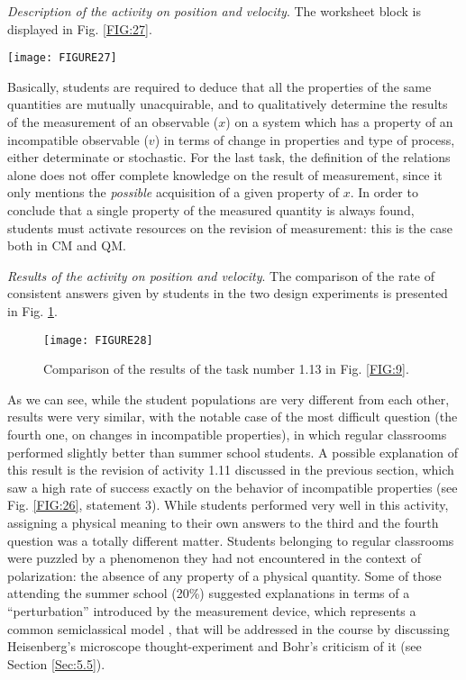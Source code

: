 \documentclass[twocolumn,secnumarabic,amssymb, nobibnotes, aps, prd, nofootinbib]{revtex4-2}
\begin{document}
\emph{Description of the activity on position and velocity}. The worksheet block is displayed in Fig. \ref{FIG:27}.
\begin{figure*}[!htpb]
       \texttt{[image: FIGURE27]}
    \caption{Using the relations between properties to discuss ideal measurement at a global level (position and velocity): worksheet block administered in the Summer School of Excellence, Udine, 2018 of Excellence and Liceo Statale Corradini, Thiene, 2018.}
    \label{FIG:27}
\end{figure*}
Basically, students are required to deduce that all the properties of the same quantities are mutually
unacquirable, and to qualitatively determine the results of the measurement of an observable ($x$) on a system which has a property of an incompatible observable ($v$) in terms of change in properties and type of process, either determinate or stochastic. For the last task, the definition of the relations alone does not offer complete knowledge on the result of measurement, since it only mentions the \emph{possible} acquisition of a given property of $x$. In order to conclude that a single property of the measured quantity is always found, students must activate resources on the revision of measurement: this is the case both in CM and QM.

\emph{Results of the activity on position and velocity}. The comparison of the rate of consistent answers given by students in the two design experiments is presented in Fig. \ref{FIG:28}.
\begin{figure}[!htpb]
       \texttt{[image: FIGURE28]}
    \caption{Comparison of the results of the task number 1.13 in Fig. \ref{FIG:9}.}
    \label{FIG:28}
\end{figure}
As we can see, while the student populations are very different from each other, results were very similar, with the notable case of the most difficult question (the fourth one, on changes in incompatible properties), in which regular classrooms performed slightly better than summer school students. A possible explanation of this result is the revision of activity 1.11 discussed in the previous section, which saw a high rate of success exactly on the behavior of incompatible properties (see Fig. \ref{FIG:26}, statement 3). While students performed very well in this activity, assigning a physical meaning to their own answers to the third and the fourth question was a totally different matter. Students belonging to regular classrooms were puzzled by a phenomenon they had not encountered in the context of polarization: the absence of any property of a physical quantity. Some of those attending the summer school (20\%) suggested explanations in terms of a ``perturbation'' introduced by the measurement device, which represents a common semiclassical model \cite{Ayene2011}, that will be addressed in the course by discussing Heisenberg's microscope thought-experiment and Bohr's criticism of it (see Section \ref{Sec:5.5}).
\end{document}
